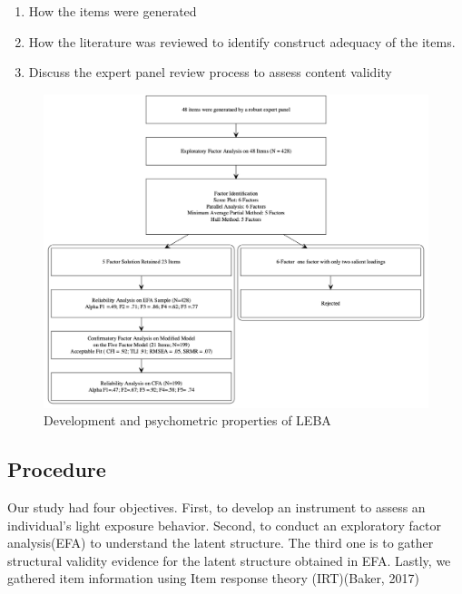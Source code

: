\documentclass[
  english,
  man]{apa6}
\providecommand{\tightlist}{%
  \setlength{\itemsep}{0pt}\setlength{\parskip}{0pt}}
\begin{document}
\begin{enumerate}
\def\labelenumi{\arabic{enumi}.}
\tightlist
\item
  How the items were generated
\item
  How the literature was reviewed to identify construct adequacy of the items.
\item
  Discuss the expert panel review process to assess content validity
\end{enumerate}

\begin{figure}

{\centering \includegraphics[width=1\linewidth,height=1\textheight]{Flowchart1} 

}

\caption{Development and psychometric properties of LEBA }\label{fig:unnamed-chunk-1}
\end{figure}

\hypertarget{procedure-1}{%
\subsection{Procedure}\label{procedure-1}}

Our study had four objectives. First, to develop an instrument to assess an individual's light exposure behavior. Second, to conduct an exploratory factor analysis(EFA) to understand the latent structure. The third one is to gather structural validity evidence for the latent structure obtained in EFA. Lastly, we gathered item information using Item response theory (IRT)(Baker, 2017)
\end{document}
